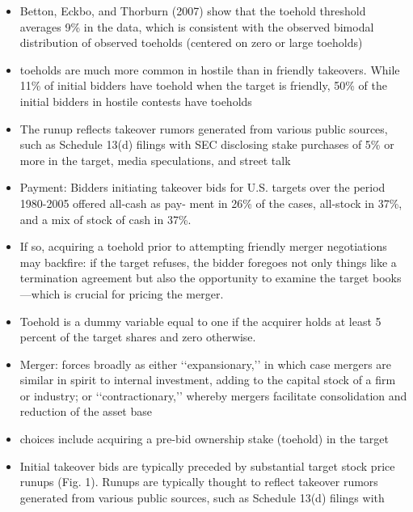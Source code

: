 \documentclass[12pt]{article}
\begin{document}
\begin{itemize}
        \item Betton, Eckbo, and Thorburn (2007) show that the toehold threshold averages 9\% in the data, which is consistent with the observed bimodal distribution of observed toeholds (centered on zero or large toeholds) \citep{Mitchell2011}

        \item toeholds are much more common in hostile than in friendly takeovers. While 11\% of initial bidders have toehold when the target is friendly, 50\% of the initial bidders in hostile contests have toeholds \citep{Mitchell2011}

        \item The runup reflects takeover rumors generated from various public sources, such as Schedule 13(d) filings with SEC disclosing stake purchases of 5\% or more in the target, media speculations, and street talk \citep{Mitchell2011}

        \item Payment: Bidders initiating takeover bids for U.S. targets over the period 1980-2005 offered all-cash as pay- ment in 26\% of the cases, all-stock in 37\%, and a mix of stock of cash in 37\%. \citep{Mitchell2011}

        \item If so, acquiring a toehold prior to attempting friendly merger negotiations may backfire: if the target refuses, the bidder foregoes not only things like a termination agreement but also the opportunity to examine the target books—which is crucial for pricing the merger. \citep{Mitchell2011}

        \item Toehold is a dummy variable equal to one if the acquirer holds at least 5 percent of the target shares and zero otherwise. \citep{Moeller2004}

        \item Merger: forces broadly as either ‘‘expansionary,’’ in which case mergers are similar in spirit to internal investment, adding to the capital stock of a firm or industry; or ‘‘contractionary,’’ whereby mergers facilitate consolidation and reduction of the asset base \citep{Andrade2004}

        \item choices include acquiring a pre-bid ownership stake (toehold) in the target \citep{Eckbo2009}

        \item Initial takeover bids are typically preceded by substantial target stock price runups (Fig. 1). Runups are typically thought to
        reflect takeover rumors generated from various public sources, such as Schedule 13(d) filings with \citep{Eckbo2009}


\end{itemize}
\end{document}
